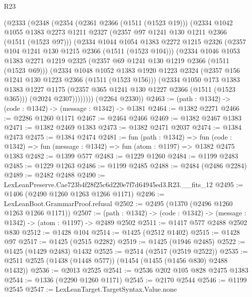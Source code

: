 \begin{lexlean}{R23}
\begin{coremodule}
    (@2333
      (@2348
        (@2354
          (@2361 @2366 (@1511 (@1523 @19)))
          (@2334
            @1042
            @1055
            @1383
            @2273
            @1211
            @2327
            (@2357 @97 @1241 @130 @1211 @2366 (@1511 (@1523 @97)))
            (@2334
              @1044
              @1054
              @1383
              @2272
              @1215
              @2326
              (@2357 @104 @1241 @130 @1215 @2366 (@1511 (@1523 @104)))
              (@2334
                @1046
                @1053
                @1383
                @2271
                @1219
                @2325
                (@2357 @69 @1241 @130 @1219 @2366 (@1511 (@1523 @69)))
                (@2334
                  @1048
                  @1052
                  @1383
                  @1920
                  @1223
                  @2324
                  (@2357 @156 @1241 @130 @1223 @2366 (@1511 (@1523 @156)))
                  (@2334
                    @1050
                    @173
                    @1383
                    @1383
                    @1227
                    @1175
                    (@2357 @365 @1241 @130 @1227 @2366 (@1511 (@1523 @365)))
                    (@2024 @2307))))))))
      (@2264 @2330))
@2463 := (path : @1342) -> (code : @1342) -> (message : @1342) -> @1381
@2464 := @1382 @2271
@2466 := @2286 @1260 @1171
@2467 := @2464 @2466
@2469 := @1382 @2467 @1383
@2471 := @1382 @2469 @1383
@2473 := @1382 @2471 @2037
@2474 := @1384 @2473
@2475 := @1384 @2474
@2481 := fun (path : @1342) =>
  fun (code : @1342) => fun (message : @1342) => fun (atom : @1197) => @1382 @2475 @1383
@2482 := @1399 @577
@2483 := @1229 @1260
@2484 := @1199 @2483
@2485 := @1229 @1263
@2486 := @1199 @2485
@2488 := @2484 (@2486 @2284)
@2489 := @2482 @2488
@2490 := LexLeanPreserve.Cae723b4f28f25c6d220e7f7d64945ed3.R23.__fits_12
@2495 := @1406 (@2490 @1260 @1263 @1266 @1171)
@2496 := LexLeanBoot.GrammarProof.refusal
@2502 := @2495 (@1370 (@2496 @1260 @1263 @1266 @1171))
@2507 := (path : @1342) -> (code : @1342) -> (message : @1342) -> (atom : @1197) -> @2489 @2502
@2511 := @1417 @577 @2488 @2502 @830
@2512 := @1428 @104
@2514 := @1425 (@2512 @1402)
@2515 := @1428 @97
@2517 := @1425 (@2515 @2282)
@2519 := @1425 (@1946 @2485)
@2522 := @1425 (@1429 @2483) @1432
@2525 := @2514 (@2517 (@2519 @2522))
@2535 := @2511 @2525 (@1438 (@1448 @577)) (@1454 (@1455 (@1456 @830) @2488 @1432))
@2536 := @2013 @2525
@2541 := @2536 @202 @105 @828 @2475 @1383
@2544 := @1336 (@2290 @1260 @1171)
@2545 := @2170 @2544
@2546 := @1199 @2545
@2547 := LexLeanTarget.TargetSyntax.Value.none

\end{coremodule}
\end{lexlean}
